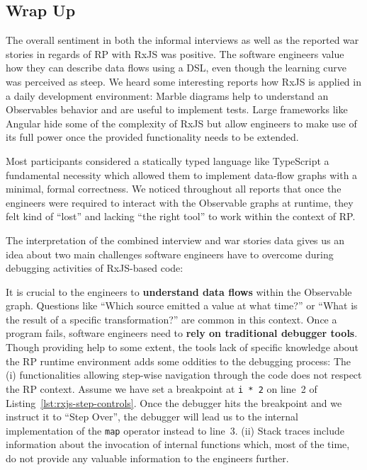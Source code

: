 \documentclass[12pt,a4paper]{article}
\begin{document}
\subsection{Wrap Up}

The overall sentiment in both the informal interviews as well as the reported war stories in regards of RP with RxJS was positive. The software engineers value how they can describe data flows using a DSL, even though the learning curve was perceived as steep. We heard some interesting reports how RxJS is applied in a daily development environment: Marble diagrams help to understand  an Observables behavior and are useful to implement tests. Large frameworks like Angular hide some of the complexity of RxJS but allow engineers to make use of its full power once the provided functionality needs to be extended.

Most participants considered a statically typed language like TypeScript a fundamental necessity which allowed them to implement data-flow graphs with a minimal, formal correctness. We noticed throughout all reports that once the engineers were required to interact with the Observable graphs at runtime, they felt kind of ``lost'' and lacking ``the right tool'' to work within the context of RP.


The interpretation of the combined interview and war stories data gives us an idea about two main challenges software engineers have to overcome during debugging activities of RxJS-based code:

It is crucial to the engineers to \textbf{understand data flows}  within the Observable graph. Questions like ``Which source emitted a value at what time?'' or ``What is the result of a specific transformation?'' are common in this context. Once a program fails, software engineers need to \textbf{rely on traditional debugger tools}. Though providing help to some extent, the tools lack of specific knowledge about the RP runtime environment adds some oddities to the debugging process: The (i) functionalities allowing step-wise navigation through the code does not respect the RP context. Assume we have set a breakpoint at \texttt{i * 2} on line~2 of Listing~\ref{lst:rxjs-step-controls}. Once the debugger hits the breakpoint and we instruct it to ``Step Over'', the debugger will lead us to the internal implementation of the \texttt{map} operator instead to line~3. (ii) Stack traces include information about the invocation of internal functions which, most of the time, do not provide any valuable information to the engineers further.
\end{document}
